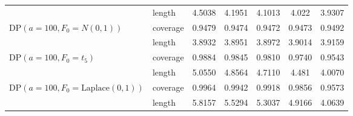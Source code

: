 \documentclass[11pt]{article}
\begin{document}
\begin{table}[htbp]
{\begin{tabular}{l l | c c c c c}
& length & 4.5038 & 4.1951 & 4.1013 & 4.022 & 3.9307 \\
DP$(a=100,F_0=N(0,1))$
& coverage & 0.9479 & 0.9474 & 0.9472 & 0.9473 & 0.9492 \\
& length & 3.8932 & 3.8951 & 3.8972 & 3.9014 & 3.9159 \\
DP$(a=100, F_0=t_5)$
& coverage & 0.9884 & 0.9845 & 0.9810 & 0.9740 & 0.9543 \\
& length & 5.0550 & 4.8564 & 4.7110 & 4.481 & 4.0070 \\
DP$(a=100,F_0=\text{Laplace}(0,1))$
& coverage & 0.9964 & 0.9942 & 0.9918 & 0.9856 & 0.9573 \\
& length & 5.8157 & 5.5294 & 5.3037 & 4.9166 & 4.0639 \\
\hline
\end{tabular}
}
\end{table}
\end{document}
